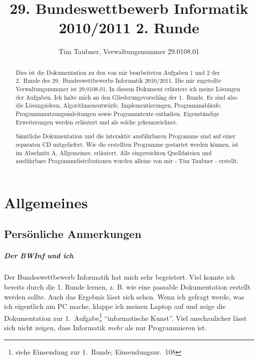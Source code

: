 \documentclass[a4paper,10pt,notitlepage]{scrreprt}
\title{29. Bundeswettbewerb Informatik 2010/2011 2. Runde}
\author{Tim Taubner, Verwaltungsnummer 29.0108.01}
\makeatletter
\renewcommand{\thechapter}{\Alph{chapter}}
\newcommand{\nobreakchap}{%
  \renewcommand\chapter{\section}
}
\newcommand{\normalchap}{%
  \renewcommand\chapter{%
  \if@openright\cleardoublepage\else\clearpage\fi
  \thispagestyle{\chapterpagestyle}%
  \global\@topnum\z@
  \@afterindentfalse
  \secdef\@chapter\@schapter}
}
\makeatother
\begin{document}
\begin{titlepage}
  \begin{samepage}
  \maketitle
  \vfill
  \begin{abstract}
   Dies ist die Dokumentation zu den von mir bearbeiteten Aufgaben 1 und 2 der 2.\ Runde des 29.\ Bundeswettbewerbs Informatik 2010/2011.
   Die mir zugeteilte Verwaltungsnummer ist 29.0108.01.
   In diesem Dokument erläutere ich meine Lösungen der Aufgaben.
   Ich halte mich an den Gliederungsvorschlag der 1.\ Runde.
   Es sind also die Lösungsideen, Algorithmenentwürfe, Implementierungen, Programmabläufe, Programmnutzungsanleitungen sowie Programmtexte enthalten.
   Eigenständige Erweiterungen werden erläutert und als solche gekennzeichnet.

   Sämtliche Dokumentation und die interaktiv ausführbaren Programme sind auf einer separaten CD mitgeliefert.
   Wie die erstellten Programme gestartet werden können, ist im Abschnitt A, Allgemeines, erläutert.
   Alle eingereichten Quelldateien und ausführbare Programmdistributionen wurden alleine von mir - Tim Taubner - erstellt.
  \end{abstract}
  \vfill
\setcounter{tocdepth}{0}
\setcounter{minitocdepth}{3}
  \dominitoc
\renewcommand{\contentsname}{Inhaltsübersicht}
  \nobreakchap
  \tableofcontents
  \vfill
  \normalchap
  \end{samepage}
\end{titlepage}

\renewcommand*\mtctitle{\bfseries\Large Inhalt der Aufgabendokumentation}
\nomtcrule

\chapter{Allgemeines}
\label{allgemein}
\fancyhead[L]{\thechapter. Allgemeines}

\section{Persönliche Anmerkungen}
\paragraph{Der BWInf und ich}
 Der Bundeswettbewerb Informatik hat mich sehr begeistert.
 Viel konnte ich bereits durch die 1. Runde lernen, z. B. wie eine passable Dokumentation erstellt werden sollte.
 Auch das Ergebnis lässt sich sehen. Wenn ich gefragt werde, was ich eigentlich am PC mache,
 klappe ich meinen Laptop auf und zeige die Dokumentation zur 1.\ Aufgabe\footnote{siehe Einsendung zur 1.\ Runde, Einsendungsnr.\ 108}  ``informatische Kunst''.
 Viel anschaulicher lässt sich nicht zeigen, dass Informatik \emph{mehr} als nur Programmieren ist.
\end{document}

